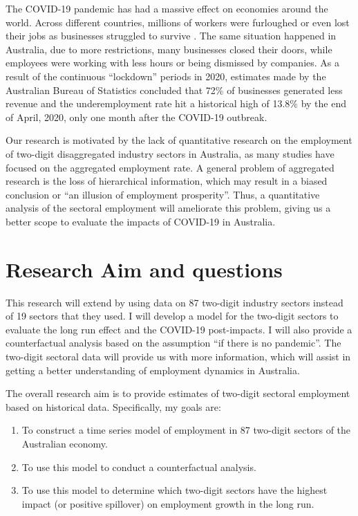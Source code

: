 \documentclass{monashthesis}
\begin{document}
The COVID-19 pandemic has had a massive effect on economies around the world. Across different countries, millions of workers were furloughed or even lost their jobs as businesses struggled to survive \autocite{ny2020}. The same situation happened in Australia, due to more restrictions, many businesses closed their doors, while employees were working with less hours or being dismissed by companies. As a result of the continuous ``lockdown'' periods in 2020, estimates made by the Australian Bureau of Statistics \autocite{ABS2021} concluded that 72\% of businesses generated less revenue and the underemployment rate hit a historical high of 13.8\% by the end of April, 2020, only one month after the COVID-19 outbreak.

Our research is motivated by the lack of quantitative research on the employment of two-digit disaggregated industry sectors in Australia, as many studies have focused on the aggregated employment rate. A general problem of aggregated research is the loss of hierarchical information, which may result in a biased conclusion or ``an illusion of employment prosperity''. Thus, a quantitative analysis of the sectoral employment will ameliorate this problem, giving us a better scope to evaluate the impacts of COVID-19 in Australia.

\hypertarget{research-aim-and-questions}{%
\section{Research Aim and questions}\label{research-aim-and-questions}}

This research will extend \textcite{anderson2020} by using data on 87 two-digit industry sectors instead of 19 sectors that they used. I will develop a model for the two-digit sectors to evaluate the long run effect and the COVID-19 post-impacts. I will also provide a counterfactual analysis based on the assumption ``if there is no pandemic''. The two-digit sectoral data will provide us with more information, which will assist in getting a better understanding of employment dynamics in Australia.

The overall research aim is to provide estimates of two-digit sectoral employment based on historical data. Specifically, my goals are:

\begin{enumerate}
\def\labelenumi{\arabic{enumi}.}
\item
  To construct a time series model of employment in 87 two-digit sectors of the Australian economy.
\item
  To use this model to conduct a counterfactual analysis.
\item
  To use this model to determine which two-digit sectors have the highest impact (or positive spillover) on employment growth in the long run.
\end{enumerate}
\end{document}

